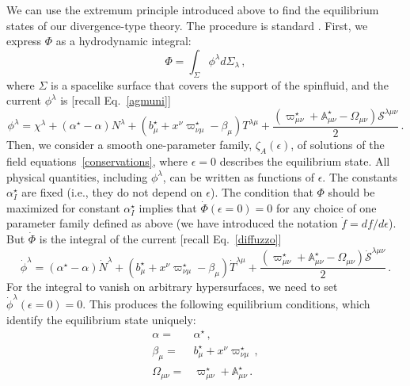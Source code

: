 \documentclass[12pt,aps,prd,nofootinbib,noshowkeys,noshowpacs,longbibliography,
superscriptaddress,tightenlines,floatfix,preprintnumbers]{revtex4-2}
\begin{document}
We can use the extremum principle introduced above to find the equilibrium states of our divergence-type theory. The procedure is standard \cite{GavassinoStabilityCarter2022,
GavassinoGENERIC2022}. First, we express $\Phi$ as a hydrodynamic integral:
\begin{equation}
    \Phi = \int_\Sigma \phi^\lambda d\Sigma_\lambda \, ,
\end{equation}
where $\Sigma$ is a spacelike surface that covers the support of the spinfluid, and the current $\phi^\lambda$ is [recall Eq.~\eqref{agmuni}]
\begin{equation}\label{philambda}
    \phi^\lambda = \chi^\lambda +(\alpha^\star-\alpha)N^\lambda + (b^\star_\mu +x^\nu \varpi^\star_{\nu \mu}-\beta_\mu)T^{\lambda \mu} + \dfrac{(\varpi^\star_{\mu \nu}+\mathbb{A}_{\mu \nu}^\star-\Omega_{\mu \nu})\mathcal{S}^{\lambda \mu \nu}}{2} \, .
\end{equation}
Then, we consider a smooth one-parameter family, $\zeta_A(\epsilon)$, of solutions of the field equations~\eqref{conservations}, where $\epsilon=0$ describes the equilibrium state. All physical quantities, including $\phi^\lambda$, can be written as functions of $\epsilon$. The constants $\alpha^\star_I$ are fixed (i.e., they do not depend on $\epsilon$). The condition that $\Phi$ should be maximized for constant $\alpha^\star_I$ implies that $\dot{\Phi}(\epsilon=0)=0$ for any choice of one parameter family defined as above (we have introduced the notation $\dot{f}=df/d\epsilon$). But $\dot{\Phi}$ is the integral of the current [recall Eq.~\eqref{diffuzzo}]
\begin{equation}\label{phidot}
    \dot{\phi}^\lambda = (\alpha^\star-\alpha)\dot{N}^\lambda + (b^\star_\mu +x^\nu \varpi^\star_{\nu \mu}-\beta_\mu)\dot{T}^{\lambda \mu} + \dfrac{(\varpi^\star_{\mu \nu}+\mathbb{A}_{\mu \nu}^\star-\Omega_{\mu \nu})\dot{\mathcal{S}}^{\lambda \mu \nu}}{2} \, .
\end{equation}
For the integral to vanish on arbitrary hypersurfaces, we need to set $\dot{\phi}^\lambda(\epsilon=0)=0$. This produces the following equilibrium conditions, which identify the equilibrium state uniquely:
\begin{equation}\label{equilibriumconditions}
    \begin{split}
        \alpha={}& \alpha^\star \, , \\
        \beta_\mu={}& b^\star_\mu +x^\nu \varpi^\star_{\nu \mu} \, , \\
        \Omega_{\mu \nu}={}& \varpi^\star_{\mu \nu}+\mathbb{A}_{\mu \nu}^\star \, . \\
    \end{split}
\end{equation}
\end{document}
